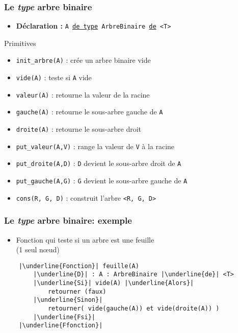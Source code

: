 \documentclass[table,handout,tikz,12pt,svgnames]{beamer}
\begin{document}
\begin{frame}[fragile=singleslide]
	\frametitle{Le \textit{type} arbre binaire}
	\vspace{-1em}
	\begin{block}{} %
		\begin{itemize}
			\item \textbf{Déclaration :} \texttt{A \underline{de type} ArbreBinaire \underline{de} <T>}
		\end{itemize}
	\end{block}
	\begin{block}{Primitives}
		\begin{itemize}%
			\item \texttt{init\_arbre(A)} : crée un arbre binaire vide
			\item \texttt{vide(A)} : teste si \texttt{A} vide
			\item \texttt{valeur(A)} : retourne la valeur de la racine
			\item \texttt{gauche(A)} : retourne le sous-arbre gauche de \texttt{A}
			\item \texttt{droite(A)} : retourne le sous-arbre droit
			\item \texttt{put\_valeur(A,V)} : range la valeur de \texttt{V} à la racine
			\item \texttt{put\_droite(A,D)} : \texttt{D} devient le sous-­arbre droit de \texttt{A}
			\item \texttt{put\_gauche(A,G)} : \texttt{G} devient le sous-arbre gauche de \texttt{A} 
			\item \texttt{cons(R, G, D)} : construit l'arbre \texttt{<R, G, D>}
		\end{itemize}
	\end{block}
\end{frame}


\begin{frame}[fragile=singleslide]
	\frametitle{Le \textit{type} arbre binaire: exemple}
	\begin{block}{} %
		\begin{itemize}
			\item Fonction qui teste si un arbre est une feuille\\(1 seul nœud)			
		\end{itemize}
	\end{block}
	\begin{block}{}
		\begin{verbatim}
	|\underline{Fonction}| feuille(A)
		|\underline{D}| : A : ArbreBinaire |\underline{de}| <T>
		|\underline{Si}| vide(A) |\underline{Alors}|
			retourner (faux)
		|\underline{Sinon}|
			retourner( vide(gauche(A)) et vide(droite(A)) )
		|\underline{Fsi}|
	|\underline{Ffonction}|		
		\end{verbatim}		
	\end{block}
\end{frame}
\end{document}
